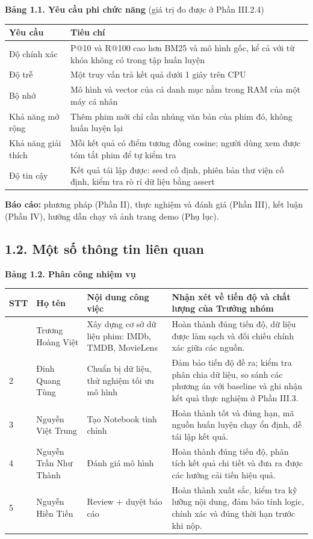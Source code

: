 \documentclass[12pt,a4paper]{article}
\newcommand{\np}{\Needspace{8\baselineskip}}
\let\oldsubsection\subsection
\renewcommand{\subsection}{\Needspace{12\baselineskip}\oldsubsection}
\begin{document}
\np\textbf{Bảng 1.1. Yêu cầu phi chức năng} (giá trị đo được ở Phần III.2.4)

{\def\LTcaptype{}\small
\begin{longtable}[]{@{}*{2}{P{(\linewidth - 2\tabcolsep) * }}@{}}
\toprule
\textbf{Yêu cầu} & \textbf{Tiêu chí} \\
\midrule
\endhead
\bottomrule
\endlastfoot
Độ chính xác & P@10 và R@100 cao hơn BM25 và mô hình gốc, kể cả với từ khóa không có trong tập huấn luyện \\
Độ trễ & Một truy vấn trả kết quả dưới 1 giây trên CPU \\
Bộ nhớ & Mô hình và vector của cả danh mục nằm trong RAM của một máy cá nhân \\
Khả năng mở rộng & Thêm phim mới chỉ cần nhúng văn bản của phim đó, không huấn luyện lại \\
Khả năng giải thích & Mỗi kết quả có điểm tương đồng cosine; người dùng xem được tóm tắt phim để tự kiểm tra \\
Độ tin cậy & Kết quả tái lập được: seed cố định, phiên bản thư viện cố định, kiểm tra rò rỉ dữ liệu bằng assert \\
\end{longtable}
}

\textbf{Báo cáo:} phương pháp (Phần II), thực nghiệm và đánh giá (Phần III), kết luận (Phần IV), hướng dẫn chạy và ảnh trang demo (Phụ lục).

\subsection{1.2. Một số thông tin liên quan}

\np\textbf{Bảng 1.2. Phân công nhiệm vụ}

{\def\LTcaptype{}\small
\begin{longtable}[]{@{}*{4}{P{(\linewidth - 6\tabcolsep) * }}@{}}
\toprule
\textbf{STT} & \textbf{Họ tên} & \textbf{Nội dung công việc} & \textbf{Nhận xét về tiến độ và chất lượng của Trưởng nhóm} \\
\midrule
\endhead
\bottomrule
{} & Trương Hoàng Việt & Xây dựng cơ sở dữ liệu phim: IMDb, TMDB, MovieLens & Hoàn thành đúng tiến độ, dữ liệu được làm sạch và đối chiếu chính xác giữa các nguồn. \\
2 & Đinh Quang Tùng & Chuẩn bị dữ liệu, thử nghiệm tối ưu mô hình & Đảm bảo tiến độ đề ra; kiểm tra phân chia dữ liệu, so sánh các phương án với baseline và ghi nhận kết quả thực nghiệm ở Phần III.3. \\
3 & Nguyễn Việt Trung & Tạo Notebook tinh chỉnh & Hoàn thành tốt và đúng hạn, mã nguồn huấn luyện chạy ổn định, dễ tái lập kết quả. \\
4 & Nguyễn Trần Như Thành & Đánh giá mô hình & Hoàn thành đúng tiến độ, phân tích kết quả chi tiết và đưa ra được các hướng cải tiến hiệu quả. \\
5 & Nguyễn Hiền Tiến & Review + duyệt báo cáo & Hoàn thành xuất sắc, kiểm tra kỹ lưỡng nội dung, đảm bảo tính logic, chính xác và đúng thời hạn trước khi nộp. \\
\end{longtable}
}
\end{document}
